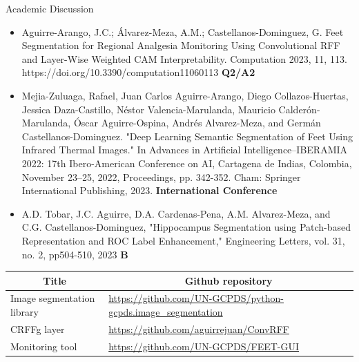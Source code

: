 \documentclass[aspectratio=169]{beamer}
\begin{document}
\begin{frame}[allowframebreaks]{Academic Discussion}

\begin{itemize}
\setlength\itemsep{1em}

\item \small{Aguirre-Arango, J.C.; Álvarez-Meza, A.M.; Castellanos-Dominguez, G. Feet Segmentation for Regional Analgesia Monitoring Using Convolutional RFF and Layer-Wise Weighted CAM Interpretability. Computation 2023, 11, 113. https://doi.org/10.3390/computation11060113} \textbf{Q2/A2}
\item \small{Mejia-Zuluaga, Rafael, Juan Carlos Aguirre-Arango, Diego Collazos-Huertas, Jessica Daza-Castillo, Néstor Valencia-Marulanda, Mauricio Calderón-Marulanda, Óscar Aguirre-Ospina, Andrés Alvarez-Meza, and Germán Castellanos-Dominguez. "Deep Learning Semantic Segmentation of Feet Using Infrared Thermal Images." In Advances in Artificial Intelligence–IBERAMIA 2022: 17th Ibero-American Conference on AI, Cartagena de Indias, Colombia, November 23–25, 2022, Proceedings, pp. 342-352. Cham: Springer International Publishing, 2023.} \textbf{International Conference}
\item \small{A.D. Tobar, J.C. Aguirre, D.A. Cardenas-Pena, A.M. Alvarez-Meza, and C.G. Castellanos-Dominguez, "Hippocampus Segmentation using Patch-based Representation and ROC Label Enhancement," Engineering Letters, vol. 31, no. 2, pp504-510, 2023} \textbf{B}

\end{itemize}


\begin{table}[]
\begin{tabular}{ll}
\hline
\multicolumn{1}{c}{\textbf{Title}}  & \multicolumn{1}{c}{\textbf{Github repository}}   \\
\hline
Image segmentation library & \textcolor{blue}{\small{\href{https://github.com/UN-GCPDS/python-gcpds.image\_segmentation}{https://github.com/UN-GCPDS/python-gcpds.image\_segmentation}}} \\
CRFFg  layer               & \textcolor{blue}{\small{\href{https://github.com/aguirrejuan/ConvRFF}{https://github.com/aguirrejuan/ConvRFF}}}                       \\
Monitoring tool            & \textcolor{blue}{\small{\href{https://github.com/UN-GCPDS/FEET-GUI}{https://github.com/UN-GCPDS/FEET-GUI}}} \\
\hline
\end{tabular}
\end{table}

\end{frame}
\end{document}
